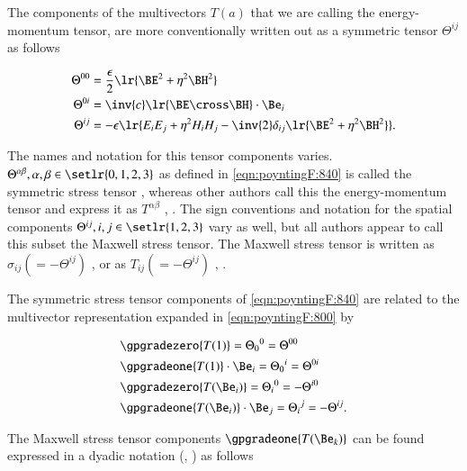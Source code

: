 The components of the multivectors \( T(a) \) that we are calling the energy-momentum tensor, are more conventionally written out
as a symmetric tensor \( \Theta^{ij} \) as follows

\begin{dmath}\label{eqn:poyntingF:840}
\begin{aligned}
\Theta^{00} &= \frac{\epsilon}{2} \lr{ \BE^2 + \eta^2 \BH^2 } \\
\Theta^{0i} &= \inv{c} \lr{ \BE \cross \BH } \cdot \Be_i \\
\Theta^{ij} &= -\epsilon \lr{ E_i E_j + \eta^2 H_i H_j - \inv{2} \delta_{ij} \lr{ \BE^2 + \eta^2 \BH^2 } }.
\end{aligned}
\end{dmath}

The names and notation for this tensor components varies.
\( \Theta^{\alpha\beta}, \alpha, \beta \in \setlr{0,1,2,3} \) as defined in \cref{eqn:poyntingF:840} is called the symmetric
stress tensor \citep{jackson1975cew},
whereas other authors call this the energy-momentum tensor and express it as \( T^{\alpha\beta} \) \citep{landau1980classical}, \citep{doran2003gap}.
The sign conventions and notation for the spatial components \( \Theta^{ij}, i, j \in \setlr{1,2,3} \) vary as well, but all authors appear to call this subset the Maxwell stress tensor.
The Maxwell stress tensor is written as \( \sigma_{ij} (=-\Theta^{ij}) \) \citep{landau1980classical}, or as
\( T_{ij} (=-\Theta^{ij}) \)
\citep{griffiths1999introduction},
\citep{jackson1975cew}.

The symmetric stress tensor components of \cref{eqn:poyntingF:840}
are related to the multivector representation expanded in \cref{eqn:poyntingF:800} by

\begin{dmath}\label{eqn:poyntingF:820}
\begin{aligned}
&\gpgradezero{ T(1) }
=
{\Theta_0}^0 = \Theta^{00} \\
&\gpgradeone{ T(1) } \cdot \Be_i
= {\Theta_0}^i = \Theta^{0i} \\
&\gpgradezero{ T(\Be_i) }
= {\Theta_i}^0 = -\Theta^{i0} \\
&\gpgradeone{ T(\Be_i) } \cdot \Be_j = {\Theta_i}^j = -\Theta^{ij}.
\end{aligned}
\end{dmath}

The Maxwell stress tensor components \( \gpgradeone{T(\Be_k)} \) can be found expressed in a dyadic notation (\citep{griffiths1999introduction}, \citep{jackson1975cew}) as follows

